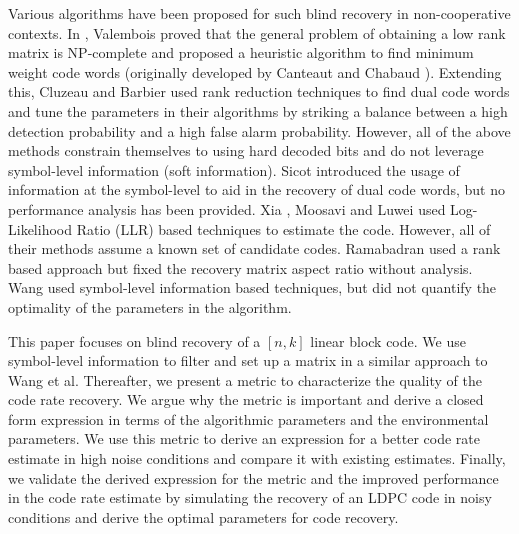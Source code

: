 \documentclass[conference]{IEEEtran}
\begin{document}
Various algorithms have been proposed for such blind recovery in non-cooperative contexts. In \cite{valembois}, Valembois proved that the general problem of obtaining a low rank matrix is NP-complete and proposed a heuristic algorithm to find minimum weight code words (originally developed by Canteaut and Chabaud \cite{cantchab}). Extending this, Cluzeau \cite{cluzeau} and Barbier \cite{barbier} used rank reduction techniques to find dual code words and tune the parameters in their algorithms by striking a balance between a high detection probability and a high false alarm probability. However, all of the above methods constrain themselves to using  hard decoded bits and do not leverage symbol-level information (soft information). Sicot \cite{sicot} introduced the usage of information at the symbol-level to aid in the recovery of dual code words, but no  performance analysis has been provided.  Xia \cite{xiawu}, Moosavi \cite{moosavi} and Luwei \cite{luwei} used Log-Likelihood Ratio (LLR) based techniques to estimate the code. However, all of their methods assume a known set of candidate codes. Ramabadran \cite{ramabadran} used a rank based approach but fixed the recovery matrix aspect ratio without analysis. Wang \cite{wang} used symbol-level information based techniques, but did not quantify the optimality of the parameters in the algorithm.

This paper focuses on blind recovery of a $[n, k]$ linear block code. We use symbol-level information to filter and set up a matrix in a similar approach to Wang et al. Thereafter, we present a metric to characterize the quality of the code rate recovery. We argue why the metric is important and derive a closed form expression in terms of the algorithmic parameters and the environmental parameters. We use this metric to derive an expression for a better code rate estimate in high noise conditions and compare it with existing estimates. Finally, we validate the derived expression for the metric and the improved performance in the code rate estimate by simulating the recovery of an LDPC code in noisy conditions and derive the optimal parameters for code recovery. 
\end{document}

